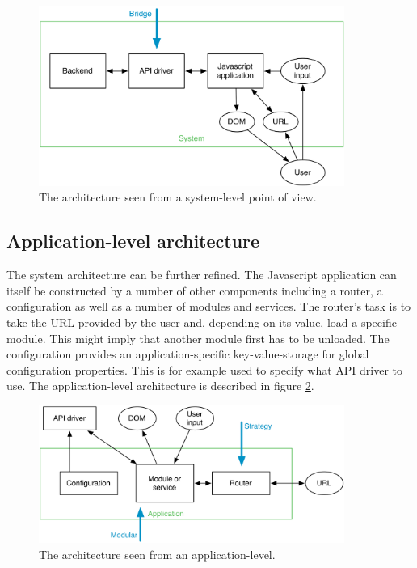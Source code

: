 \begin{figure}[h!]
	\centerline{\includegraphics[width=100mm]{gfx/system_design_abstract.png}}
	\caption{The architecture seen from a system-level point of view.}
	\label{fig:system_design_abstract}
\end{figure}

\subsection{Application-level architecture}

The system architecture can be further refined. The Javascript application can itself be constructed by a number of other components including a router, a configuration as well as a number of modules and services. The router's task is to take the URL provided by the user and, depending on its value, load a specific module. This might imply that another module first has to be unloaded. The configuration provides an application-specific key-value-storage for global configuration properties. This is for example used to specify what API driver to use. The application-level architecture is described in figure \ref{fig:arch_app}.

\begin{figure}[h!]
	\centerline{\includegraphics[width=100mm]{gfx/system_design_app.png}}
	\caption{The architecture seen from an application-level.}
	\label{fig:arch_app}
\end{figure}

